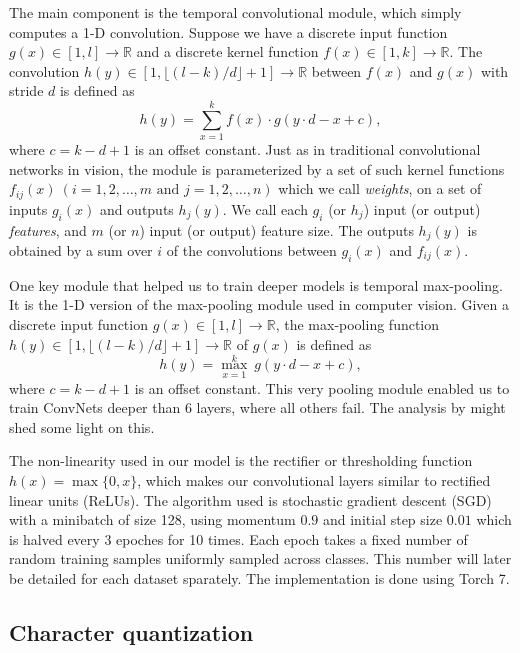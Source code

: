 The main component is the temporal convolutional module, which simply computes a 1-D convolution. Suppose we have a discrete input function \(g(x) \in [1,l] \rightarrow \mathbb{R}\) and a discrete kernel function \(f(x) \in [1, k] \rightarrow \mathbb{R}\). The convolution \(h(y) \in [1,\lfloor (l-k)/d \rfloor + 1] \rightarrow \mathbb{R}\)  between \(f(x)\) and \(g(x)\) with stride \(d\) is defined as
\[
h(y) = \sum_{x = 1}^{k} f(x) \cdot g(y \cdot d - x + c),
\]
where \(c = k - d + 1\) is an offset constant. Just as in traditional convolutional networks in vision, the module is parameterized by a set of such kernel functions \(f_{ij} (x) ~ (i = 1, 2, \dots, m \text{ and } j = 1, 2, \dots, n )\) which we call \textit{weights}, on a set of inputs \(g_i(x) \) and outputs \(h_j(y)\). We call each \(g_i\) (or \(h_j\)) input (or output) \textit{features}, and \(m\) (or \(n\)) input (or output) feature size. The outputs \(h_j(y)\) is obtained by a sum over \(i\) of the convolutions between \(g_i(x)\) and \(f_{ij}(x)\).

One key module that helped us to train deeper models is temporal max-pooling. It is the 1-D version of the max-pooling module used in computer vision\cite{BBLP10}. Given a discrete input function \(g(x) \in [1,l] \rightarrow \mathbb{R}\), the max-pooling function \(h(y) \in [1,\lfloor (l-k)/d \rfloor + 1] \rightarrow \mathbb{R}\) of \(g(x)\) is defined as
\[
h(y) = \max_{x = 1}^{k} ~ g(y \cdot d - x + c),
\]
where \(c = k - d + 1\) is an offset constant. This very pooling module enabled us to train ConvNets deeper than 6 layers, where all others fail. The analysis by \cite{BPL10} might shed some light on this.

The non-linearity used in our model is the rectifier or thresholding function \(h(x) = \max\{0, x\}\), which makes our convolutional layers similar to rectified linear units (ReLUs)\cite{NH10}. The algorithm used is stochastic gradient descent (SGD) with a minibatch of size 128, using momentum\cite{P64}\cite{SMDH13} \(0.9\) and initial step size \(0.01\) which is halved every 3 epoches for 10 times. Each epoch takes a fixed number of random training samples uniformly sampled across classes. This number will later be detailed for each dataset sparately. The implementation is done using Torch 7\cite{CKF11}.

\subsection{Character quantization}

